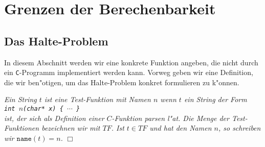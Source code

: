 \chapter{Grenzen der Berechenbarkeit}
\section{Das Halte-Problem}
In diesem Abschnitt werden wir eine konkrete Funktion angeben, die
nicht durch ein \texttt{C}-Programm implementiert werden kann.  Vorweg geben wir eine Definition, die
wir ben"otigen, um das Halte-Problem konkret formulieren zu k"onnen.
\begin{Definition} {\em Ein String $t$ ist eine \emph{Test-Funktion} mit Namen $n$ wenn $t$ ein
String der Form \\[0.3cm]
\hspace*{1.3cm} {\tt int $n$(char* x) \{ $\cdots$ \}} \\[0.3cm]
ist, der sich als Definition einer $C$-Funktion parsen l"a\3t.  Die Menge der
Test-Funktionen bezeichnen wir mit $T\!F$.  Ist $t \in T\!F$ und hat den Namen $n$, so
schreiben wir $\mathtt{name}(t) = n$.} \hspace*{\fill} $\Box$
\end{Definition}

